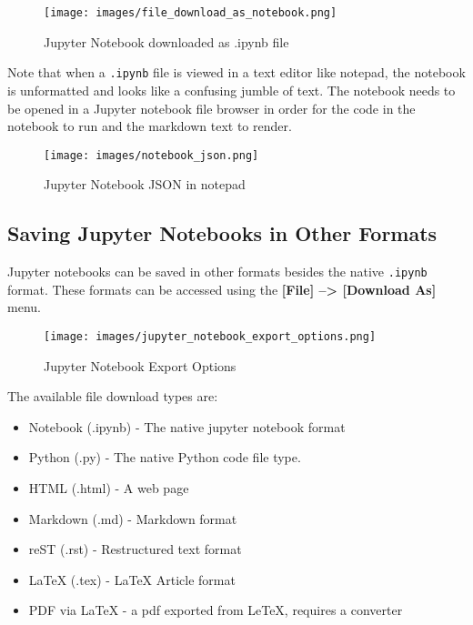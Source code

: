 \documentclass{book}
\makeatletter
\def\maxwidth{\ifdim\Gin@nat@width>\linewidth\linewidth
\else\Gin@nat@width\fi}
\let\Oldincludegraphics\includegraphics
\renewcommand{\includegraphics}[1]{\Oldincludegraphics[width=.8\maxwidth]{#1}}
\providecommand{\tightlist}{%
      \setlength{\itemsep}{0pt}\setlength{\parskip}{0pt}}
\newcommand{\passthrough}[1]{#1}
\makeatother
\begin{document}
\begin{figure}
\centering
\texttt{[image: images/file\_download\_as\_notebook.png]}
\caption{Jupyter Notebook downloaded as .ipynb file}
\end{figure}

Note that when a \passthrough{\lstinline!.ipynb!} file is viewed in a
text editor like notepad, the notebook is unformatted and looks like a
confusing jumble of text. The notebook needs to be opened in a Jupyter
notebook file browser in order for the code in the notebook to run and
the markdown text to render.

\begin{figure}
\centering
\texttt{[image: images/notebook\_json.png]}
\caption{Jupyter Notebook JSON in notepad}
\end{figure}
    




    
        \hypertarget{saving-jupyter-notebooks-in-other-formats}{%
\subsection{Saving Jupyter Notebooks in Other
Formats}\label{saving-jupyter-notebooks-in-other-formats}}

Jupyter notebooks can be saved in other formats besides the native
\passthrough{\lstinline!.ipynb!} format. These formats can be accessed
using the \textbf{{[}File{]} --\textgreater{} {[}Download As{]}} menu.

\begin{figure}
\centering
\texttt{[image: images/jupyter\_notebook\_export\_options.png]}
\caption{Jupyter Notebook Export Options}
\end{figure}

The available file download types are:

\begin{itemize}
\tightlist
\item
  Notebook (.ipynb) - The native jupyter notebook format
\item
  Python (.py) - The native Python code file type.
\item
  HTML (.html) - A web page
\item
  Markdown (.md) - Markdown format
\item
  reST (.rst) - Restructured text format
\item
  LaTeX (.tex) - LaTeX Article format
\item
  PDF via LaTeX - a pdf exported from LeTeX, requires a converter
\end{itemize}
\end{document}
